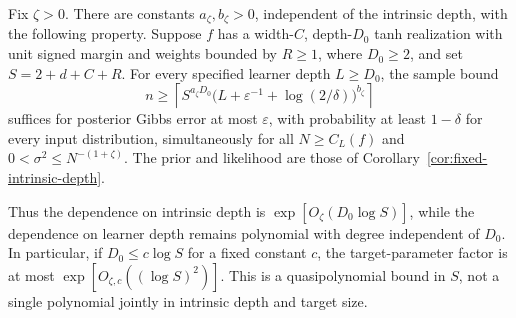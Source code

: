 \begin{corollary}
\label{cor:intrinsic-depth-quantitative}
Fix $\zeta>0$. There are constants $a_\zeta,b_\zeta>0$, independent of
the intrinsic depth, with the following property. Suppose $f$ has a
width-$C$, depth-$D_0$ tanh realization with unit signed margin and
weights bounded by $R\ge1$, where $D_0\ge2$, and set
$S=2+d+C+R$. For every specified learner depth $L\ge D_0$, the sample
bound
\[
 n\ge\left\lceil S^{a_\zeta D_0}
       \bigl(L+\varepsilon^{-1}+\log(2/\delta)\bigr)^{b_\zeta}
       \right\rceil
\]
suffices for posterior Gibbs error at most $\varepsilon$, with probability
at least $1-\delta$ for every input distribution, simultaneously for all
$N\ge C_L(f)$ and $0<\sigma^2\le N^{-(1+\zeta)}$.
The prior and likelihood are those of
Corollary~\ref{cor:fixed-intrinsic-depth}.

Thus the dependence on intrinsic depth is
$\exp[O_\zeta(D_0\log S)]$, while the dependence on learner depth remains
polynomial with degree independent of $D_0$. In particular, if
$D_0\le c\log S$ for a fixed constant $c$, the target-parameter factor
is at most $\exp[O_{\zeta,c}((\log S)^2)]$.
This is a quasipolynomial bound in $S$, not a single polynomial jointly
in intrinsic depth and target size.
\end{corollary}

